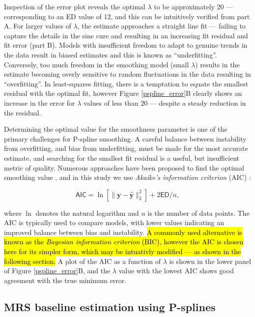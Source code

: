 \documentclass[num-refs]{wiley-article}
\newcommand{\revone}[2]{\hl{#1}\marginnote{\hl{#2}}}
\begin{document}
Inspection of the error plot reveals the optimal $\lambda$ to be approximately 20 --- corresponding to an ED value of 12, and this can be intuitively verified from part A. For larger values of $\lambda$, the estimate approaches a straight line fit --- failing to capture the details in the sine cure and resulting in an increasing fit residual and fit error (part B). Models with insufficient freedom to adapt to genuine trends in the data result in biased estimates and this is known as ``underfitting''. Conversely, too much freedom in the smoothing model (small $\lambda$) results in the estimate becoming overly sensitive to random fluctuations in the data resulting in ``overfitting''. In least-squares fitting, there is a temptation to equate the smallest residual with the optimal fit, however Figure \ref{pspline_error}B clearly shows an increase in the error for $\lambda$ values of less than 20 --- despite a steady reduction in the residual.

Determining the optimal value for the smoothness parameter is one of the primary challenges for P-spline smoothing. A careful balance between instability from overfitting, and bias from underfitting, must be made for the most accurate estimate, and searching for the smallest fit residual is a useful, but insufficient metric of quality. Numerous approaches have been proposed to find the optimal smoothing value \cite{Ruppert2003}, and in this study we use \textit{Akaike's information criterion} (AIC) \cite{Akaike1973}:

\begin{equation}
  \textsf{AIC} = \ln \left[ \|\mathbf{y} - \hat{\mathbf{y}}\|^{2}_{2} \right] + 2 \textsf{ED} / n,
  \label{aic}
\end{equation}

where $\ln$ denotes the natural logarithm and $n$ is the number of data points. The AIC is typically used to compare models, with lower values indicating an improved balance between bias and instability. \revone{A commonly used alternative is known as the \textit{Bayesian information criterion} (BIC), however the AIC is chosen here for its simpler form, which may be intuativly modified --- as shown in the following section.}{R1.9} A plot of the AIC as a function of $\lambda$ is shown in the lower panel of Figure \ref{pspline_error}B, and the $\lambda$ value with the lowest AIC shows good agreement with the true minimum error.

\subsection{MRS baseline estimation using P-splines}
\end{document}
